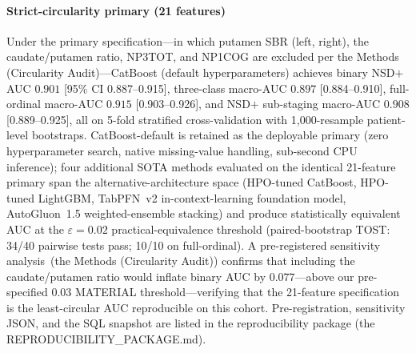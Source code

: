 \documentclass[10pt,letterpaper]{article}
\begin{document}
\paragraph*{Strict-circularity primary (21 features)} Under the primary specification---in which putamen SBR (left, right), the caudate/putamen ratio, NP3TOT, and NP1COG are excluded per the Methods (Circularity Audit)---CatBoost (default hyperparameters) achieves binary NSD$+$ AUC $\mathbf{0.901}$ [95\% CI 0.887--0.915], three-class macro-AUC $0.897$ [0.884--0.910], full-ordinal macro-AUC $0.915$ [0.903--0.926], and NSD$+$ sub-staging macro-AUC $0.908$ [0.889--0.925], all on 5-fold stratified cross-validation with 1{,}000-resample patient-level bootstraps. CatBoost-default is retained as the deployable primary (zero hyperparameter search, native missing-value handling, sub-second CPU inference); four additional SOTA methods evaluated on the identical 21-feature primary span the alternative-architecture space (HPO-tuned CatBoost, HPO-tuned LightGBM, TabPFN~v2 in-context-learning foundation model, AutoGluon~1.5 weighted-ensemble stacking) and produce statistically equivalent AUC at the $\varepsilon{=}0.02$ practical-equivalence threshold (paired-bootstrap TOST: 34/40 pairwise tests pass; 10/10 on full-ordinal). A pre-registered sensitivity analysis~(the Methods (Circularity Audit)) confirms that including the caudate/putamen ratio would inflate binary AUC by $0.077$---above our pre-specified $0.03$ MATERIAL threshold---verifying that the 21-feature specification is the least-circular AUC reproducible on this cohort. Pre-registration, sensitivity JSON, and the SQL snapshot are listed in the reproducibility package (the REPRODUCIBILITY\_PACKAGE.md).
\end{document}
